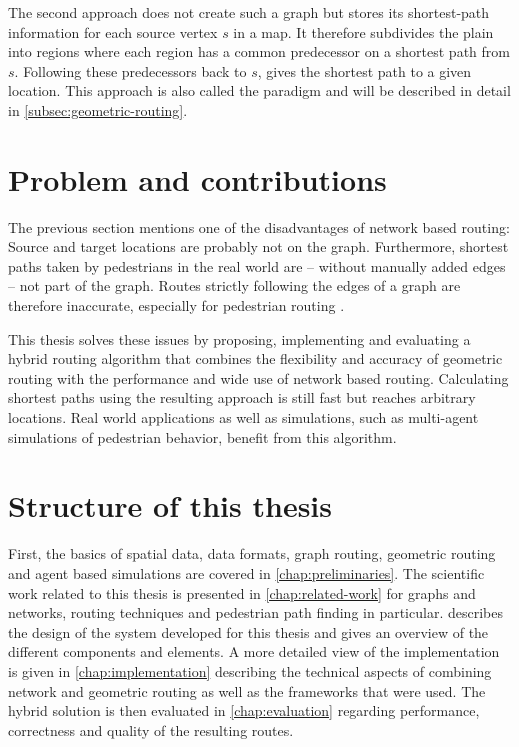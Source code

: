 	The second approach does not create such a graph but stores its shortest-path information for each source vertex $s$ in a map.
	It therefore subdivides the plain into regions where each region has a common predecessor on a shortest path from $s$.
	Following these predecessors back to $s$, gives the shortest path to a given location.
	This approach is also called the  paradigm and will be described in detail in \cref{subsec:geometric-routing}.
	
\section{Problem and contributions}

	The previous section mentions one of the disadvantages of network based routing:
	Source and target locations are probably not on the graph.
	Furthermore, shortest paths taken by pedestrians in the real world are -- without manually added edges -- not part of the graph.
	Routes strictly following the edges of a graph are therefore inaccurate, especially for pedestrian routing \cite[1]{graser-osm-open-spaces}.

	This thesis solves these issues by proposing, implementing and evaluating a hybrid routing algorithm that combines the flexibility and accuracy of geometric routing with the performance and wide use of network based routing.
	Calculating shortest paths using the resulting approach is still fast but reaches arbitrary locations.
	Real world applications as well as simulations, such as multi-agent simulations of pedestrian behavior, benefit from this algorithm.
	
\section{Structure of this thesis}

	First, the basics of spatial data, data formats, graph routing, geometric routing and agent based simulations are covered in \cref{chap:preliminaries}.
	The scientific work related to this thesis is presented in \cref{chap:related-work} for graphs and networks, routing techniques and pedestrian path finding in particular.
	 describes the design of the system developed for this thesis and gives an overview of the different components and elements.
	A more detailed view of the implementation is given in \cref{chap:implementation} describing the technical aspects of combining network and geometric routing as well as the frameworks that were used.
	The hybrid solution is then evaluated in \cref{chap:evaluation} regarding performance, correctness and quality of the resulting routes.